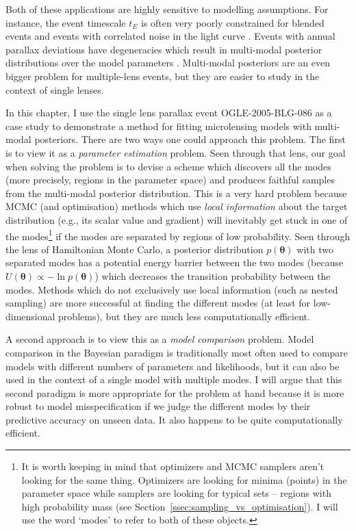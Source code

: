 \documentclass[12pt,dvipsnames]{report}
\renewcommand{\vec}[1]{\boldsymbol{\mathbf{#1}}}
\begin{document}
Both of these applications are highly sensitive to modelling assumptions. For instance, 
the event timescale $t_E$ is often very poorly constrained \citep{2009MNRAS.393..816D} 
for blended events and events with correlated noise in the light curve \citep{golovich2022}. 
Events with annual parallax deviations have degeneracies 
which result in multi-modal posterior distributions over the model parameters \citep{2004ApJ...606..319G}.
Multi-modal posteriors are an even bigger problem for multiple-lens events, but they are 
easier to study in the context of single lenses. 

In this chapter, I use the single lens parallax event OGLE-2005-BLG-086 as a case study
to demonstrate a method for fitting microlensing models with multi-modal posteriors. There are two 
ways one could approach this problem. The first is to view it as a \emph{parameter estimation}
problem. Seen through that lens, our goal when solving the problem is to devise a scheme 
which discovers all the modes (more precisely, regions in the parameter space) and 
produces faithful samples from the multi-modal  posterior distribution. 
This is a very hard problem because MCMC (and optimisation) methods which 
use \emph{local information} about the target distribution (e.g., its scalar value and gradient) will inevitably get 
stuck in one of the modes\footnote{
    It is worth keeping in mind that optimizers and MCMC samplers aren't looking for 
    the same thing. Optimizers are looking for minima (points) in the parameter 
    space while samplers are looking for typical sets -- regions with high probability 
    mass (see Section~\ref{ssec:sampling_vs_optimisation}). I will use the word `modes' to refer to both of these objects.}
 if the modes are separated by regions of low probability. 
Seen through the lens of Hamiltonian Monte Carlo, a posterior distribution 
$p(\vec\theta)$ with two separated modes has a potential energy barrier between the 
two modes (because  $U(\vec\theta)\propto -\ln p(\vec\theta)$) which decreases
the transition probability between the modes. Methods which do not exclusively use 
local information (such as nested sampling) are more successful at finding the different modes 
(at least for low-dimensional problems), but they are much less computationally efficient.

A second approach is to view this as a \emph{model comparison} problem. Model comparison
in the Bayesian paradigm is traditionally most often used to compare 
models with different numbers of parameters and likelihoods, but it can also be used 
in the context of a single model with multiple modes. 
I will argue that this second 
paradigm is more appropriate for the problem at hand because it is more robust to 
model misspecification  if we judge the different modes by their predictive accuracy
on unseen data. It also happens to be quite computationally efficient.
\end{document}
